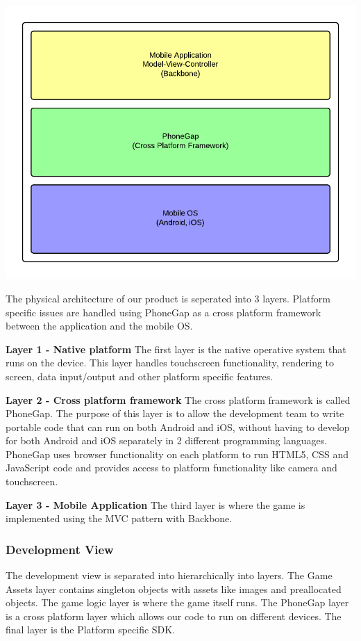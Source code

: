 \includegraphics[width=\textwidth]{pictures/physical_view}

The physical architecture of our product is seperated into 3 layers. Platform specific issues are handled 
using PhoneGap as a cross platform framework between the application and the mobile OS.

{\bf Layer 1 - Native platform}
The first layer is the native operative system that runs on the device. This layer handles touchscreen 
functionality, rendering to screen, data input/output and other platform specific features.

{\bf Layer 2 - Cross platform framework}
The cross platform framework is called PhoneGap. The purpose of this layer is to allow the development 
team to write portable code that can run on both Android and iOS, without having to develop for both 
Android and iOS separately in 2 different programming languages. PhoneGap uses browser functionality on 
each platform to run HTML5, CSS and JavaScript code and provides access to platform functionality like 
camera and touchscreen.

{\bf Layer 3 - Mobile Application}
The third layer is where the game is implemented using the MVC pattern with Backbone. 


\subsubsection{Development View} %
The development view is separated into hierarchically into layers. The Game Assets layer contains 
singleton objects with assets like images and preallocated objects. The game logic layer is where 
the game itself runs. The PhoneGap layer is a cross platform layer which allows our code to run on 
different devices. The final layer is the Platform specific SDK.


